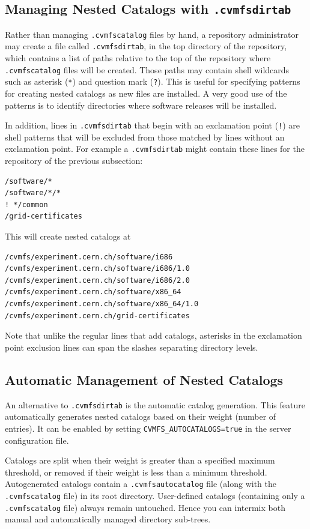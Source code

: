 \subsection{Managing Nested Catalogs with \texttt{.cvmfsdirtab}}
\label{sct:dirtab}
Rather than managing \texttt{.cvmfscatalog} files by hand, a repository administrator may create a file called \texttt{.cvmfsdirtab}, in the top directory of the repository, which contains a list of paths relative to the top of the repository where \texttt{.cvmfscatalog} files will be created.
Those paths may contain shell wildcards such as asterisk (\texttt{*}) and question mark (\texttt{?}).
This is useful for specifying patterns for creating nested catalogs as new files are installed.
A very good use of the patterns is to identify directories where software releases will be installed.

In addition, lines in \texttt{.cvmfsdirtab} that begin with an exclamation point (\texttt{!}) are shell patterns that will be excluded from those matched by lines without an exclamation point.
For example a \texttt{.cvmfsdirtab} might contain these lines for the repository of the previous subsection:
\begin{verbatim}
/software/*
/software/*/*
! */common
/grid-certificates
\end{verbatim}
This will create nested catalogs at
\begin{verbatim}
/cvmfs/experiment.cern.ch/software/i686
/cvmfs/experiment.cern.ch/software/i686/1.0
/cvmfs/experiment.cern.ch/software/i686/2.0
/cvmfs/experiment.cern.ch/software/x86_64
/cvmfs/experiment.cern.ch/software/x86_64/1.0
/cvmfs/experiment.cern.ch/grid-certificates
\end{verbatim}
Note that unlike the regular lines that add catalogs, asterisks in the exclamation point exclusion lines can span the slashes separating directory levels.

\subsection{Automatic Management of Nested Catalogs}
\label{sct:autocatalogs}
An alternative to \texttt{.cvmfsdirtab} is the automatic catalog generation.
This feature automatically generates nested catalogs based on their weight (number of entries).
It can be enabled by setting \texttt{CVMFS\_AUTOCATALOGS=true} in the server configuration file.

Catalogs are split when their weight is greater than a specified maximum threshold, or removed if their weight is less than a minimum threshold.
Autogenerated catalogs contain a \texttt{.cvmfsautocatalog} file (along with the \texttt{.cvmfscatalog} file) in its root directory.
User-defined catalogs (containing only a \texttt{.cvmfscatalog} file) always remain untouched.
Hence you can intermix both manual and automatically managed directory sub-trees.

